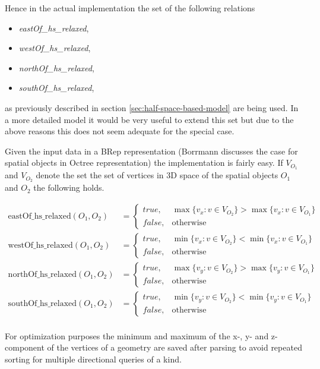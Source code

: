 \documentclass[paper=a4, fontsize=11pt]{scrartcl} %
\numberwithin{equation}{section} %
\numberwithin{figure}{section} %
\numberwithin{table}{section} %
\begin{document}
Hence in the actual implementation the set of the following relations
\begin{itemize}
\item \textit{eastOf\_hs\_relaxed},
\item \textit{westOf\_hs\_relaxed},
\item \textit{northOf\_hs\_relaxed},
\item \textit{southOf\_hs\_relaxed},
\end{itemize}
as previously described in section \ref{sec:half-space-based-model} are being used. In a more detailed model it would be very useful to extend this set but due to the above reasons this does not seem adequate for the special case. 

Given the input data in a BRep representation (Borrmann \cite{Borrmann:2009:AEI} discusses the case for spatial objects in Octree representation) the implementation is fairly easy. If $V_{O_1}$ and $V_{O_2}$ denote the set  the set of vertices in 3D space of the spatial objects $O_1$ and $O_2$ the following holds.

\begin{align*}
  \mathrm{eastOf\_hs\_relaxed}(O_1,O_2) &= \begin{cases} true, & \max\{v_x:v\in V_{O_{2}}\} > \max\{v_x:v\in V_{O_1}\} \\ false, & \mathrm{otherwise} \end{cases} \\
  \mathrm{westOf\_hs\_relaxed}(O_1,O_2) &= \begin{cases} true, & \min\{v_x:v\in V_{O_{2}}\} < \min\{v_x:v\in V_{O_1}\} \\ false, & \mathrm{otherwise} \end{cases} \\
  \mathrm{northOf\_hs\_relaxed}(O_1,O_2) &= \begin{cases} true, & \max\{v_y:v\in V_{O_{2}}\} > \max\{v_y:v\in V_{O_1}\} \\ false, & \mathrm{otherwise} \end{cases} \\
  \mathrm{southOf\_hs\_relaxed}(O_1,O_2) &= \begin{cases} true, & \min\{v_y:v\in V_{O_{2}}\} < \min\{v_y:v\in V_{O_1}\} \\ false, & \mathrm{otherwise} \end{cases} \\
\end{align*}

For optimization purposes the minimum and maximum of the x-, y- and z-component of the vertices of a geometry are saved after parsing to avoid repeated sorting for   multiple directional queries of a kind. 
{}


\end{document}
